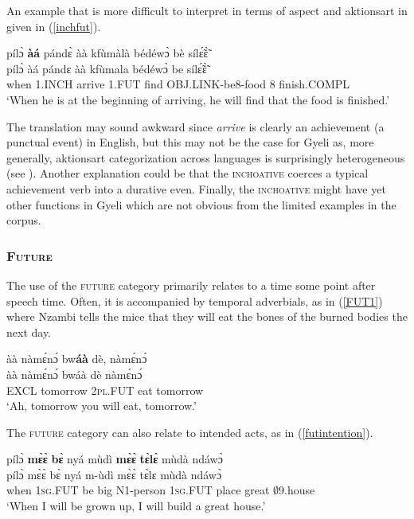 An example that is more difficult to interpret in terms of aspect and aktionsart in given in (\ref{inchfut}).

\begin{exe} 
\ex\label{inchfut}
  \glll  pílɔ̀ {\bfseries àá} pándɛ̀ àà kfùmàlà bédéwɔ̀ bè sílɛ̃́ɛ̃̀ \\
         pílɔ̀ àá pándɛ àà kfùmala bédéwɔ̀ be sílɛ̃́ɛ̃̀ \\
           when 1.INCH arrive 1.FUT find OBJ.LINK-be8-food 8 finish.COMPL  \\
    \trans `When he is at the beginning of arriving, he will find that the food is finished.'
\end{exe}

The translation may sound awkward since {\itshape arrive} is clearly an achievement (a punctual event) in English, but this may not be the case for Gyeli as, more generally, aktionsart categorization across languages is surprisingly heterogeneous (see \citealp{botne2006}). Another explanation could be that the \textsc{inchoative} coerces a typical achievement verb into a durative even. Finally, the \textsc{inchoative} might have yet other functions in Gyeli which are not obvious from the limited examples in the corpus.





\subsubsection{\textsc{Future}}
\label{sec:fut}

The use of the \textsc{future} category primarily relates to a time some point after speech time. Often, it is accompanied by temporal adverbials, as in (\ref{FUT1}) where Nzambi tells the mice that they will eat the bones of the burned bodies the next day.

\begin{exe} 
\ex\label{FUT1}
  \glll àà nàmɛ́nɔ́ bw{\bfseries áà} dè, nàmɛ́nɔ́ \\
        àà nàmɛ́nɔ́ bwáà dè nàmɛ́nɔ́ \\
       EXCL tomorrow 2\textsc{pl}.FUT eat tomorrow  \\
    \trans `Ah, tomorrow you will eat, tomorrow.'
\end{exe}

\noindent The \textsc{future} category can also relate to intended acts, as in (\ref{futintention}).


\begin{exe} 
\ex\label{futintention}
  \glll  pílɔ̀ {\bfseries mɛ̀ɛ̀} {\bfseries bɛ̀} nyá mùdì {\bfseries mɛ̀ɛ̀} {\bfseries tɛ̀lɛ̀} mùdà ndáwɔ̀ \\
         pílɔ̀ mɛ̀ɛ̀ bɛ̀ nyá m-ùdì mɛ̀ɛ̀ tɛ̀lɛ mùdà ndáwɔ̀ \\
           when 1\textsc{sg}.FUT be big N1-person 1\textsc{sg}.FUT place great $\emptyset$9.house  \\
    \trans `When I will be grown up, I will build a great house.'
\end{exe}

